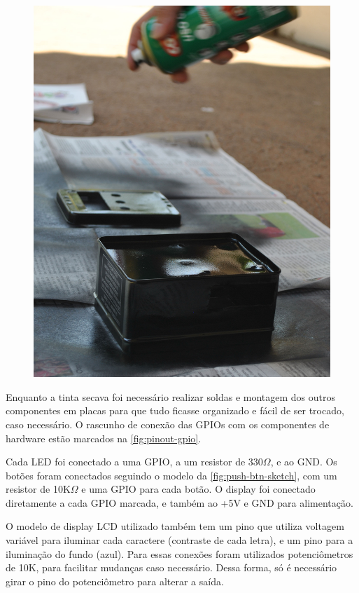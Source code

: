 \documentclass[
		12pt,				%
		openright,			%
		oneside,			%
		a4paper,			%
		chapter=TITLE,		%
		english,			%
		brazil				%
	]{abntex2}
\begin{document}
\begin{figure}[htb]
\begin{minipage}{0.47\textwidth}
		\includegraphics[width=1\textwidth]{img/pintar-2.jpg}
	\end{minipage}
\end{figure}

Enquanto a tinta secava foi necessário realizar soldas e montagem dos outros componentes em placas para que tudo ficasse organizado e fácil de ser trocado, caso necessário. O rascunho de conexão das GPIOs com os componentes de hardware estão marcados na \autoref{fig:pinout-gpio}.

Cada LED foi conectado a uma GPIO, a um resistor de 330$\Omega$, e ao GND. Os botões foram conectados seguindo o modelo da \autoref{fig:push-btn-sketch}, com um resistor de 10K$\Omega$ e uma GPIO para cada botão. O display foi conectado diretamente a cada GPIO marcada, e também ao +5V e GND para alimentação. 

O modelo de display LCD utilizado também tem um pino que utiliza voltagem variável para iluminar cada caractere (contraste de cada letra), e um pino para a iluminação do fundo (azul). Para essas conexões foram utilizados potenciômetros de 10K, para facilitar mudanças caso necessário. Dessa forma, só é necessário girar o pino do potenciômetro para alterar a saída.
\end{document}
